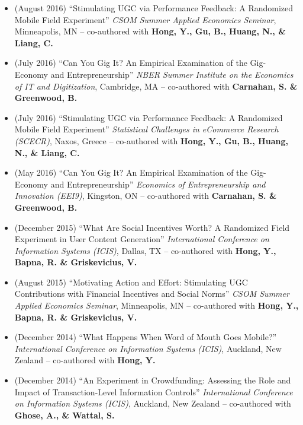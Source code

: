 \documentclass[10.5pt,letterpaper,sans]{moderncv}        %
\begin{document}
\begin{itemize}
\item (August 2016) ``Stimulating UGC via Performance Feedback: A Randomized Mobile Field Experiment'' \textit{CSOM Summer Applied Economics Seminar}, Minneapolis, MN -- co-authored with \textbf{Hong, Y., Gu, B., Huang, N., \& Liang, C.}

\item (July 2016) ``Can You Gig It? An Empirical Examination of the Gig-Economy and Entrepreneurship'' \textit{NBER Summer Institute on the Economics of IT and Digitization}, Cambridge, MA -- co-authored with \textbf{Carnahan, S. \& Greenwood, B.}

\item (July 2016) ``Stimulating UGC via Performance Feedback: A Randomized Mobile Field Experiment'' \textit{Statistical Challenges in eCommerce Research (SCECR)}, Naxos, Greece -- co-authored with \textbf{Hong, Y., Gu, B., Huang, N., \& Liang, C.}

\item (May 2016) ``Can You Gig It? An Empirical Examination of the Gig-Economy and Entrepreneurship'' \textit{Economics of Entrepreneurship and Innovation (EEI9)}, Kingston, ON -- co-authored with \textbf{Carnahan, S. \& Greenwood, B.}

\item (December 2015) ``What Are Social Incentives Worth? A Randomized Field Experiment in User Content Generation'' \textit{International Conference on Information Systems (ICIS)}, Dallas, TX -- co-authored with \textbf{Hong, Y., Bapna, R. \& Griskevicius, V.}

\item (August 2015) ``Motivating Action and Effort: Stimulating UGC Contributions with Financial Incentives and Social Norms'' \textit{CSOM Summer Applied Economics Seminar}, Minneapolis, MN -- co-authored with \textbf{Hong, Y., Bapna, R. \& Griskevicius, V.}

\item (December 2014) ``What Happens When Word of Mouth Goes Mobile?'' \textit{International Conference on Information Systems (ICIS)}, Auckland, New Zealand -- co-authored with \textbf{Hong, Y.}

\item (December 2014) ``An Experiment in Crowdfunding: Assessing the Role and Impact of Transaction-Level Information Controls'' \textit{International Conference on Information Systems (ICIS)}, Auckland, New Zealand -- co-authored with \textbf{Ghose, A., \& Wattal, S.}


\end{itemize}
\end{document}

